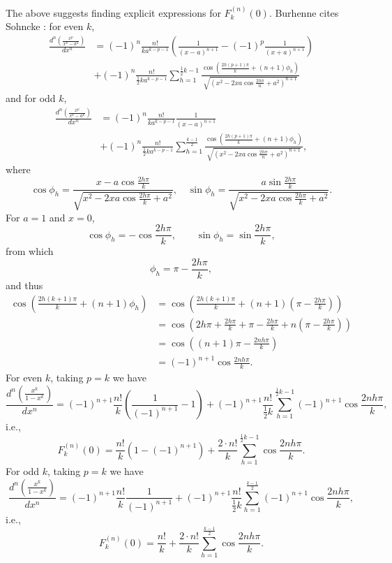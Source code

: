 \documentclass{amsart}
\begin{document}
The above suggests finding explicit expressions for $F_k^{(n)}(0)$. 
Burhenne cites Sohncke \cite[pp.~32--33]{sohncke}: for even $k$,
\begin{align*}
\frac{d^n\left(\frac{x^p}{x^k-a^k}\right)}{dx^n}&=(-1)^n \frac{n!}{ka^{k-p-1}}
\left(\frac{1}{(x-a)^{n+1}} - (-1)^p \frac{1}{(x+a)^{n+1}}\right)\\
&+(-1)^n \frac{n!}{\frac{1}{2}ka^{k-p-1}} \sum_{h=1}^{\frac{1}{2}k-1}
\frac{\cos\left(\frac{2h(p+1)\pi}{k}+(n+1)\phi_h\right)}{\sqrt{\left(x^2-2xa\cos \frac{2h\pi}{n}+a^2\right)^{n+1}}}
\end{align*}
and for odd $k$,
\begin{align*}
\frac{d^n\left(\frac{x^p}{x^k-a^k}\right)}{dx^n}&=(-1)^n \frac{n!}{ka^{k-p-1}} \frac{1}{(x-a)^{n+1}}\\
&+(-1)^n \frac{n!}{\frac{1}{2}ka^{k-p-1}} \sum_{h=1}^{\frac{k-1}{2}} \frac{\cos\left( \frac{2h(p+1)\pi}{k}+(n+1)\phi_h \right)}{\sqrt{\left( x^2-2xa\cos \frac{2h\pi}{n}+a^2 \right)^{n+1}}},
\end{align*}
where
\[
\cos \phi_h = \frac{x-a\cos\frac{2h\pi}{k}}{\sqrt{x^2-2xa\cos \frac{2h\pi}{k}+a^2}},
\quad \sin\phi_h = \frac{a\sin \frac{2h\pi}{k}}{\sqrt{x^2-2xa\cos \frac{2h\pi}{k}+a^2}}.
\]
For $a=1$ and $x=0$,
\[
\cos \phi_h = -\cos \frac{2h\pi}{k}, \qquad
\sin \phi_h = \sin \frac{2h \pi}{k},
\]
from which
\[
\phi_h = \pi-\frac{2h\pi}{k},
\]
and thus
\begin{align*}
\cos\left( \frac{2h(k+1)\pi}{k}+(n+1)\phi_h \right)&=
\cos\left( \frac{2h(k+1)\pi}{k}+(n+1)\left( \pi-\frac{2h\pi}{k}\right) \right)\\
&=\cos\left( 2h\pi+\frac{2h\pi}{k}+\pi-\frac{2h\pi}{k}+n\left( \pi-\frac{2h\pi}{k}\right)\right)\\
&=\cos \left( (n+1)\pi- \frac{2nh\pi}{k}\right)\\
&=(-1)^{n+1} \cos \frac{2nh\pi}{k}.
\end{align*}
For even $k$, taking $p=k$ we have
\[
\frac{d^n\left(\frac{x^k}{1-x^k}\right)}{dx^n}=(-1)^{n+1} \frac{n!}{k}\left( \frac{1}{(-1)^{n+1}}-1\right)
+(-1)^{n+1} \frac{n!}{\frac{1}{2}k} \sum_{h=1}^{\frac{1}{2}k-1} (-1)^{n+1} \cos \frac{2nh\pi}{k},
\]
i.e.,
\[
F_k^{(n)}(0) = \frac{n!}{k}(1-(-1)^{n+1})
+\frac{2\cdot n!}{k} \sum_{h=1}^{\frac{1}{2}k-1} \cos \frac{2nh\pi}{k}.
\]
For odd $k$, taking $p=k$ we have
\[
\frac{d^n\left(\frac{x^k}{1-x^k}\right)}{dx^n}=(-1)^{n+1} \frac{n!}{k} \frac{1}{(-1)^{n+1}}
+(-1)^{n+1} \frac{n!}{\frac{1}{2}k} \sum_{h=1}^{\frac{k-1}{2}} (-1)^{n+1} \cos \frac{2nh\pi}{k},
\]
i.e.,
\[
F_k^{(n)}(0) = \frac{n!}{k}+\frac{2\cdot n!}{k} \sum_{h=1}^{\frac{k-1}{2}} \cos \frac{2nh\pi}{k}.
\]
\end{document}
